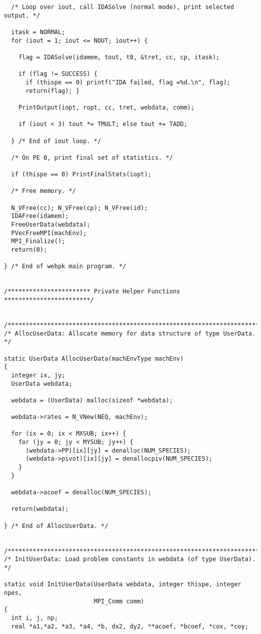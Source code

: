 \documentclass[11pt]{article}
\begin{document}
\begin{verbatim}
  /* Loop over iout, call IDASolve (normal mode), print selected output. */

  itask = NORMAL;
  for (iout = 1; iout <= NOUT; iout++) {

    flag = IDASolve(idamem, tout, t0, &tret, cc, cp, itask);

    if (flag != SUCCESS) { 
      if (thispe == 0) printf("IDA failed, flag =%d.\n", flag); 
      return(flag); }

    PrintOutput(iopt, ropt, cc, tret, webdata, comm);

    if (iout < 3) tout *= TMULT; else tout += TADD;

  } /* End of iout loop. */

  /* On PE 0, print final set of statistics. */

  if (thispe == 0) PrintFinalStats(iopt);

  /* Free memory. */

  N_VFree(cc); N_VFree(cp); N_VFree(id);
  IDAFree(idamem);
  FreeUserData(webdata);
  PVecFreeMPI(machEnv);
  MPI_Finalize();
  return(0);

} /* End of webpk main program. */


/*********************** Private Helper Functions ************************/


/*************************************************************************/
/* AllocUserData: Allocate memory for data structure of type UserData.   */

static UserData AllocUserData(machEnvType machEnv)
{
  integer ix, jy;
  UserData webdata;

  webdata = (UserData) malloc(sizeof *webdata);

  webdata->rates = N_VNew(NEQ, machEnv);

  for (ix = 0; ix < MXSUB; ix++) {
    for (jy = 0; jy < MYSUB; jy++) {
      (webdata->PP)[ix][jy] = denalloc(NUM_SPECIES);
      (webdata->pivot)[ix][jy] = denallocpiv(NUM_SPECIES);
    }
  }

  webdata->acoef = denalloc(NUM_SPECIES);
 
  return(webdata);

} /* End of AllocUserData. */


/*************************************************************************/
/* InitUserData: Load problem constants in webdata (of type UserData).   */

static void InitUserData(UserData webdata, integer thispe, integer npes, 
                         MPI_Comm comm)
{
  int i, j, np;
  real *a1,*a2, *a3, *a4, *b, dx2, dy2, **acoef, *bcoef, *cox, *coy;


\end{verbatim}
\end{document}
